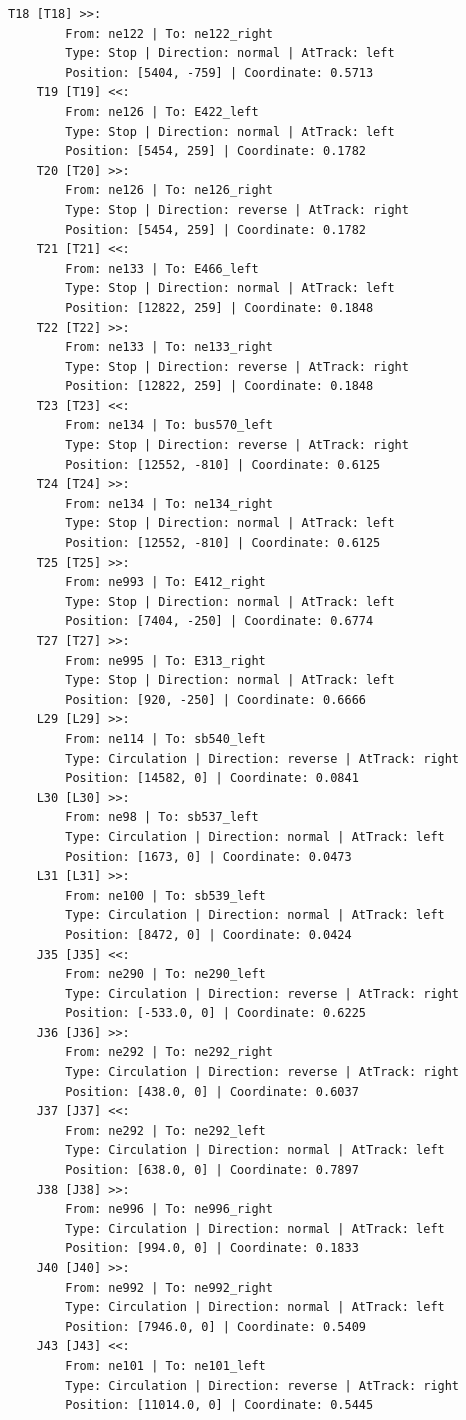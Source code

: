 \begin{lstlisting}[language = {}, tabsize=4, basicstyle=\footnotesize\ttfamily, showspaces=false, showstringspaces=false, caption = Signalling.RNA, label = {lst:EJ4_6}]
	T18 [T18] >>:
		From: ne122 | To: ne122_right
		Type: Stop | Direction: normal | AtTrack: left 
		Position: [5404, -759] | Coordinate: 0.5713
	T19 [T19] <<:
		From: ne126 | To: E422_left
		Type: Stop | Direction: normal | AtTrack: left 
		Position: [5454, 259] | Coordinate: 0.1782
	T20 [T20] >>:
		From: ne126 | To: ne126_right
		Type: Stop | Direction: reverse | AtTrack: right 
		Position: [5454, 259] | Coordinate: 0.1782
	T21 [T21] <<:
		From: ne133 | To: E466_left
		Type: Stop | Direction: normal | AtTrack: left 
		Position: [12822, 259] | Coordinate: 0.1848
	T22 [T22] >>:
		From: ne133 | To: ne133_right
		Type: Stop | Direction: reverse | AtTrack: right 
		Position: [12822, 259] | Coordinate: 0.1848
	T23 [T23] <<:
		From: ne134 | To: bus570_left
		Type: Stop | Direction: reverse | AtTrack: right 
		Position: [12552, -810] | Coordinate: 0.6125
	T24 [T24] >>:
		From: ne134 | To: ne134_right
		Type: Stop | Direction: normal | AtTrack: left 
		Position: [12552, -810] | Coordinate: 0.6125
	T25 [T25] >>:
		From: ne993 | To: E412_right
		Type: Stop | Direction: normal | AtTrack: left 
		Position: [7404, -250] | Coordinate: 0.6774
	T27 [T27] >>:
		From: ne995 | To: E313_right
		Type: Stop | Direction: normal | AtTrack: left 
		Position: [920, -250] | Coordinate: 0.6666
	L29 [L29] >>:
		From: ne114 | To: sb540_left
		Type: Circulation | Direction: reverse | AtTrack: right 
		Position: [14582, 0] | Coordinate: 0.0841
	L30 [L30] >>:
		From: ne98 | To: sb537_left
		Type: Circulation | Direction: normal | AtTrack: left 
		Position: [1673, 0] | Coordinate: 0.0473
	L31 [L31] >>:
		From: ne100 | To: sb539_left
		Type: Circulation | Direction: normal | AtTrack: left 
		Position: [8472, 0] | Coordinate: 0.0424
	J35 [J35] <<:
		From: ne290 | To: ne290_left
		Type: Circulation | Direction: reverse | AtTrack: right 
		Position: [-533.0, 0] | Coordinate: 0.6225
	J36 [J36] >>:
		From: ne292 | To: ne292_right
		Type: Circulation | Direction: reverse | AtTrack: right 
		Position: [438.0, 0] | Coordinate: 0.6037
	J37 [J37] <<:
		From: ne292 | To: ne292_left
		Type: Circulation | Direction: normal | AtTrack: left 
		Position: [638.0, 0] | Coordinate: 0.7897
	J38 [J38] >>:
		From: ne996 | To: ne996_right
		Type: Circulation | Direction: normal | AtTrack: left 
		Position: [994.0, 0] | Coordinate: 0.1833
	J40 [J40] >>:
		From: ne992 | To: ne992_right
		Type: Circulation | Direction: normal | AtTrack: left 
		Position: [7946.0, 0] | Coordinate: 0.5409
	J43 [J43] <<:
		From: ne101 | To: ne101_left
		Type: Circulation | Direction: reverse | AtTrack: right 
		Position: [11014.0, 0] | Coordinate: 0.5445

\end{lstlisting}
